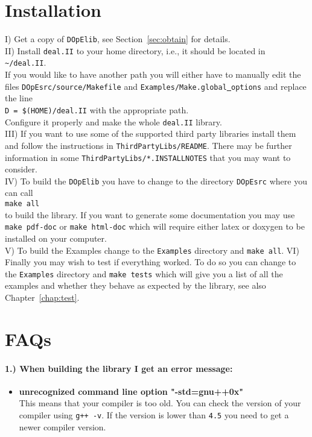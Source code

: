 \section{Installation}
\label{sec_installation}
I) Get a copy of \texttt{DOpElib}, see Section~\ref{sec:obtain} for details.\\[1mm]
%
II) Install \texttt{deal.II} to your home directory, i.e., it should be located in \\
\texttt{\textasciitilde/deal.II}. \\[1mm]
If you would like to have another path you will either have to manually edit the files
\texttt{DOpEsrc/source/Makefile} and \texttt{Examples/Make.global\underline{ }options} and replace the 
line \\
\texttt{D = \$(HOME)/deal.II} with the appropriate path.\\[1mm]
Configure it properly and make the whole \texttt{deal.II} library.\\[3mm]
%
III) If you want to use some of the supported third party libraries install them and follow 
 the instructions in \texttt{ThirdPartyLibs/README}. There may be further information 
 in some \texttt{ThirdPartyLibs/*.INSTALLNOTES} that you may want to consider.\\[3mm]
%
IV) To build the \texttt{DOpElib} you have to change to the directory 
\texttt{DOpEsrc} where you can call\\ 
\texttt{make all}\\
to build the library. If you want to generate some documentation you may use
\texttt{make pdf-doc} or \texttt{make html-doc} which will require either 
latex or doxygen to be installed on your computer.\\[3mm]
%
V) To build the Examples change to the \texttt{Examples} directory and \texttt{make all}.
%
VI) Finally you may wish to test if everything worked. To do so you can 
change to the \texttt{Examples} directory and \texttt{make tests} which will give you a 
list of all the examples and whether they behave as expected by the library, see also 
Chapter~\ref{chap:test}.

\section{FAQs}
\paragraph{1.) When building the library I get an error message:}
\begin{itemize}
\item {\bf unrecognized command line option "-std=gnu++0x"}\\
  This means that your compiler is too old. You can check the 
  version of your compiler using \texttt{g++ -v}. If the version is lower than
  \texttt{4.5} you need to get a newer compiler version.
\end{itemize}

